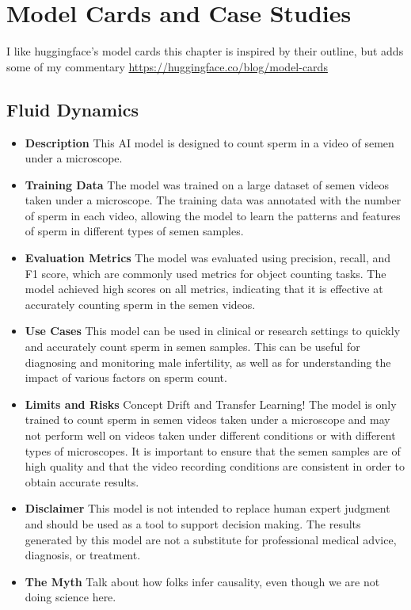 \setchapterpreamble[u]{\margintoc}
\chapter{Model Cards and Case Studies}

I like huggingface's model cards this chapter is inspired by their outline, but adds some of my commentary \url{https://huggingface.co/blog/model-cards}

\section{Fluid Dynamics}

\begin{itemize}
\item \textbf{Description} This AI model is designed to count sperm in a video of semen under a microscope.
\item \textbf{Training Data} The model was trained on a large dataset of semen videos taken under a microscope. The training data was annotated with the number of sperm in each video, allowing the model to learn the patterns and features of sperm in different types of semen samples.
\item \textbf{Evaluation Metrics} The model was evaluated using precision, recall, and F1 score, which are commonly used metrics for object counting tasks. The model achieved high scores on all metrics, indicating that it is effective at accurately counting sperm in the semen videos.
\item \textbf{Use Cases} This model can be used in clinical or research settings to quickly and accurately count sperm in semen samples. This can be useful for diagnosing and monitoring male infertility, as well as for understanding the impact of various factors on sperm count.
\item \textbf{Limits and Risks} Concept Drift and Transfer Learning! The model is only trained to count sperm in semen videos taken under a microscope and may not perform well on videos taken under different conditions or with different types of microscopes. It is important to ensure that the semen samples are of high quality and that the video recording conditions are consistent in order to obtain accurate results.
\item \textbf{Disclaimer} This model is not intended to replace human expert judgment and should be used as a tool to support decision making. The results generated by this model are not a substitute for professional medical advice, diagnosis, or treatment.
\item \textbf{The Myth} Talk about how folks infer causality, even though we are not doing science here.
\end{itemize}

